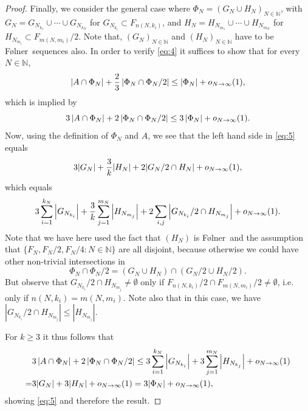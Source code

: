 \documentclass[10pt,a4paper]{amsart}
\newcommand{\Folner}{F\o{}lner}
\def\N{{\mathbb N}}
\newcommand{\oh}{{\rm o}}
\begin{document}
\begin{proof}
Finally, we consider the general case where $\Phi_N=(G_N \cup H_N)_{N\in \N}$, with $G_N=G_{N_{k_1}}\cup \cdots \cup G_{N_{k_N}}$ for $G_{N_{k_i}}\subset F_{n(N,k_i)}$, and $H_N=H_{N_{m_1}}\cup \cdots \cup H_{N_{m_N}}$ for 
$H_{N_{m_i}} \subset F_{m(N,m_i)}/2$. Note that, $(G_N)_{N\in \N}$ and $(H_N)_{N\in \N}$ have to be \Folner\ sequences also. 
In order to verify \eqref{eq:4} it 
suffices to show that for every $N\in \N$, 
$$\left| A\cap \Phi_N \right| + \frac{2}{3} \left| \Phi_N\cap \Phi_N/2 \right| \leq \left| \Phi_N \right| + \oh_{N\to\infty}(1),$$
which is implied by
\begin{equation}\label{eq:5}
3\left| A\cap \Phi_N \right| + 2\left| \Phi_N\cap \Phi_N/2 \right| \leq 3 \left| \Phi_N \right| + \oh_{N\to\infty}(1).  
\end{equation}
Now, using the definition of $\Phi_N$ and $A$, we see that the 
left hand side in \eqref{eq:5} equals 
$$ 3|G_N|+\frac{3}{k}|H_N|+2 |G_N/2\cap H_N| + \oh_{N\to\infty}(1),$$
which equals
$$3\sum_{i=1}^{k_N}\left|G_{N_{k_i}}\right| + \frac{3}{k}\sum_{j=1}^{m_N} \left| H_{N_{m_j}} \right| + 
2 \sum_{i,j} \left| G_{N_{k_i}}/2 \cap H_{N_{m_j}}  \right| + \oh_{N\to\infty}(1). $$
Note that we have here used the fact that $(H_N)$ is \Folner\ and the assumption that 
$\{F_N,F_N/2,F_N/4:N\in \N\}$ are all disjoint, because otherwise 
we could have other non-trivial intersections in 
$$\Phi_N\cap \Phi_N/2=(G_N\cup H_N)\cap (G_N/2\cup H_N/2).$$ 
But observe that $G_{N_{k_i}}/2 \cap H_{N_{m_j}} \neq \emptyset$ only if $F_{n(N,k_i)}/2 \cap F_{m(N,m_i)}/2 \neq \emptyset$, i.e. only if $n(N,k_i)=m(N,m_i)$. Note also that in this case, we have $|G_{N_{k_i}}/2 \cap H_{N_{m_j}}|\leq |H_{N_{m_j}}|$. 

For $k\geq 3$ it thus follows that
\begin{align*}
& 3\left| A\cap \Phi_N \right| + 2\left| \Phi_N\cap \Phi_N/2 \right| \leq 3 \sum_{i=1}^{k_N}\left|G_{N_{k_i}}\right| + 3 \sum_{j=1}^{m_N}\left|H_{N_{k_j}}\right| + \oh_{N\to\infty}(1) \\ 
=& 3|G_N|+3|H_N|+\oh_{N\to\infty}(1)=3|\Phi_N|+\oh_{N\to\infty}(1),    
\end{align*}
showing \eqref{eq:5} and therefore the result. 
\end{proof}
\end{document}
